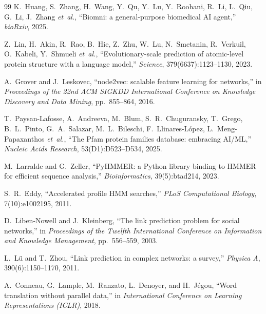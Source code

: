\documentclass[pdflatex,sn-mathphys-num]{sn-jnl}
\begin{document}
\begin{thebibliography}{99}
K.~Huang, S.~Zhang, H.~Wang, Y.~Qu, Y.~Lu, Y.~Roohani, R.~Li, L.~Qiu, G.~Li, J.~Zhang \emph{et~al.},
``Biomni: a general-purpose biomedical AI agent,''
\emph{bioRxiv}, 2025.

Z.~Lin, H.~Akin, R.~Rao, B.~Hie, Z.~Zhu, W.~Lu, N.~Smetanin, R.~Verkuil, O.~Kabeli, Y.~Shmueli \emph{et~al.},
``Evolutionary-scale prediction of atomic-level protein structure with a language model,''
\emph{Science}, 379(6637):1123--1130, 2023.

A.~Grover and J.~Leskovec,
``node2vec: scalable feature learning for networks,''
in \emph{Proceedings of the 22nd ACM SIGKDD International Conference on Knowledge Discovery and Data Mining}, pp.~855--864, 2016.

T.~Paysan-Lafosse, A.~Andreeva, M.~Blum, S.~R.~Chuguransky, T.~Grego, B.~L.~Pinto, G.~A.~Salazar, M.~L.~Bileschi, F.~Llinares-L{\'o}pez, L.~Meng-Papaxanthos \emph{et~al.},
``The Pfam protein families database: embracing AI/ML,''
\emph{Nucleic Acids Research}, 53(D1):D523--D534, 2025.

M.~Larralde and G.~Zeller,
``PyHMMER: a Python library binding to HMMER for efficient sequence analysis,''
\emph{Bioinformatics}, 39(5):btad214, 2023.

S.~R.~Eddy,
``Accelerated profile HMM searches,''
\emph{PLoS Computational Biology}, 7(10):e1002195, 2011.

D.~Liben-Nowell and J.~Kleinberg,
``The link prediction problem for social networks,''
in \emph{Proceedings of the Twelfth International Conference on Information and Knowledge Management}, pp.~556--559, 2003.

L.~L{\"u} and T.~Zhou,
``Link prediction in complex networks: a survey,''
\emph{Physica A}, 390(6):1150--1170, 2011.

A.~Conneau, G.~Lample, M.~Ranzato, L.~Denoyer, and H.~J{\'e}gou,
``Word translation without parallel data,''
in \emph{International Conference on Learning Representations (ICLR)}, 2018.

\end{thebibliography}
\end{document}
